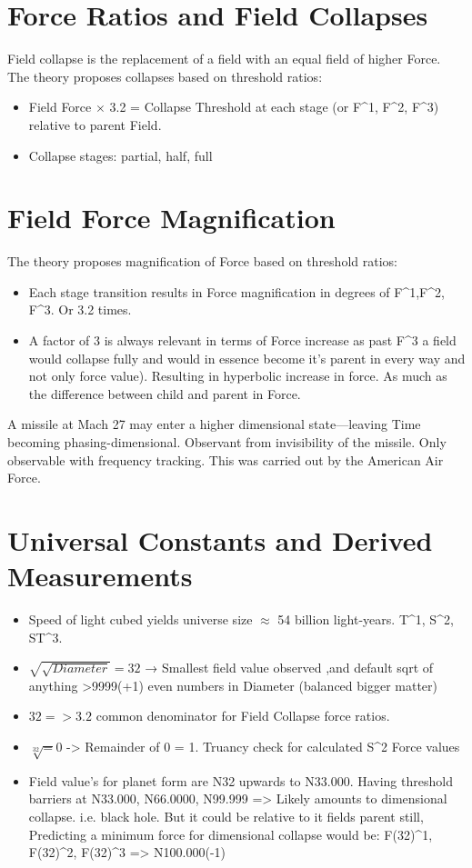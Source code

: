 \documentclass[12pt]{article}
\begin{document}
\section{Force Ratios and Field Collapses}
Field collapse is the replacement of a field with an equal field of higher Force.
The theory proposes collapses based on threshold ratios:
\begin{itemize}
    \item Field Force $\times$ 3.2 = Collapse Threshold at each stage (or F^1, F^2, F^3) relative to parent Field.
    \item Collapse stages: partial, half, full
\end{itemize}

\section{Field Force Magnification}
The theory proposes magnification of Force based on threshold ratios:
\begin{itemize}
    \item Each stage transition results in Force magnification in degrees of F^1,F^2, F^3. Or 3.2 times.
    \item A factor of 3 is always relevant in terms of Force increase as past F^3 a field would collapse fully and would in essence become it's parent in every way and not only force value). Resulting in hyperbolic increase in force. As much as the difference between child and parent in Force. 
\end{itemize}

A missile at Mach 27 may enter a higher dimensional state—leaving Time becoming phasing-dimensional.
Observant from invisibility of the missile. Only observable with frequency tracking. This was carried out by the American Air Force.

\section{Universal Constants and Derived Measurements}
\begin{itemize}
    \item Speed of light cubed yields universe size $\approx$ 54 billion light-years. T^1, S^2, ST^3.
    \item $\sqrt{\sqrt{Diameter}} = 32$ → Smallest field value observed ,and default sqrt of anything >9999(+1) even numbers in Diameter (balanced bigger matter) 
    \item {$32 => 3.2$} common denominator for Field Collapse force ratios.
    \item $\sqrt[32] = 0$ -> Remainder of 0 = 1. Truancy check for calculated S^2 Force values
    \item Field value's for planet form are N32 upwards to N33.000. Having threshold barriers at N33.000, N66.0000, N99.999 => Likely amounts to dimensional collapse. i.e. black hole. But it could be relative to it fields parent still, Predicting a minimum force for dimensional collapse  would be:
    F(32)^1, F(32)^2, F(32)^3 => N100.000(-1) 
\end{itemize}
\end{document}
